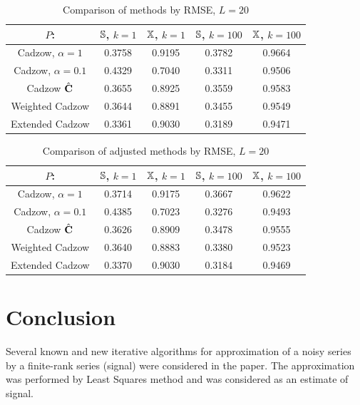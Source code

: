 \documentclass[12pt,a4paper,fleqn,leqno]{article}
\begin{document}
\begin{table}[!hhh]
\begin{center}
\caption{Comparison of methods by RMSE, $L = 20$}\label{fintable}
\begin{tabular}{|c|c|c|c|c|}
\hline
$P$: & $\mathbb{S}$, $k = 1$ & $\mathbb{X}$, $k = 1$ & $\mathbb{S}$, $k = 100$ & $\mathbb{X}$, $k = 100$  \\
\hline
Cadzow, $\alpha = 1$ & 0.3758 & 0.9195 & 0.3782 & 0.9664 \\
\hline
Cadzow, $\alpha = 0.1$ & 0.4329 & 0.7040 & 0.3311 & 0.9506 \\
\hline
Cadzow $\hat{\mathbf{C}}$ & 0.3655 & 0.8925 & 0.3559 & 0.9583 \\
\hline
Weighted Cadzow & 0.3644 & 0.8891 & 0.3455 & 0.9549 \\
\hline
Extended Cadzow & 0.3361 & 0.9030 & 0.3189 & 0.9471 \\
\hline
\end{tabular}
\end{center}
\end{table}

\begin{table}[!hhh]
	\begin{center}
		\caption{Comparison of adjusted methods by RMSE, $L = 20$}\label{fintable_improved}
		\begin{tabular}{|c|c|c|c|c|}
			\hline
			$P$: & $\mathbb{S}$, $k = 1$ & $\mathbb{X}$, $k = 1$ & $\mathbb{S}$, $k = 100$ & $\mathbb{X}$, $k = 100$  \\
			\hline
			Cadzow, $\alpha = 1$ & 0.3714 & 0.9175 & 0.3667 & 0.9622 \\
			\hline
			Cadzow, $\alpha = 0.1$ & 0.4385 & 0.7023 & 0.3276 & 0.9493 \\
			\hline
			Cadzow $\hat{\mathbf{C}}$ & 0.3626 & 0.8909 & 0.3478 & 0.9555 \\
			\hline
			Weighted Cadzow & 0.3640 & 0.8883 & 0.3380 & 0.9523 \\
			\hline
			Extended Cadzow & 0.3370 & 0.9030 & 0.3184 & 0.9469 \\
			\hline
		\end{tabular}
	\end{center}
\end{table}

\section{Conclusion}
\label{sec:concl}
Several known and new iterative algorithms for approximation of a noisy series by a finite-rank series (signal) were considered in the paper. The approximation was performed by Least Squares method and was considered as an estimate of signal.
\end{document}
